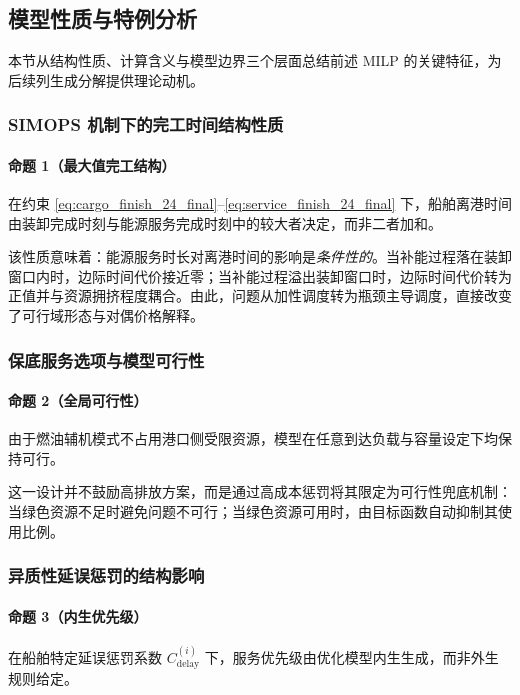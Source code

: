 \documentclass[UTF8, a4paper, 12pt]{ctexart}
\theoremstyle{plain}
\theoremstyle{definition}
\theoremstyle{remark}
\begin{document}
\subsection{模型性质与特例分析}
\label{sec:properties}

本节从结构性质、计算含义与模型边界三个层面总结前述 MILP 的关键特征，为后续列生成分解提供理论动机。

\subsubsection{SIMOPS 机制下的完工时间结构性质}

\paragraph{命题 1（最大值完工结构）}
在约束 \eqref{eq:cargo_finish_24_final}--\eqref{eq:service_finish_24_final} 下，船舶离港时间由装卸完成时刻与能源服务完成时刻中的较大者决定，而非二者加和。

该性质意味着：能源服务时长对离港时间的影响是\emph{条件性的}。当补能过程落在装卸窗口内时，边际时间代价接近零；当补能过程溢出装卸窗口时，边际时间代价转为正值并与资源拥挤程度耦合。由此，问题从加性调度转为瓶颈主导调度，直接改变了可行域形态与对偶价格解释。

\subsubsection{保底服务选项与模型可行性}

\paragraph{命题 2（全局可行性）}
由于燃油辅机模式不占用港口侧受限资源，模型在任意到达负载与容量设定下均保持可行。

这一设计并不鼓励高排放方案，而是通过高成本惩罚将其限定为可行性兜底机制：当绿色资源不足时避免问题不可行；当绿色资源可用时，由目标函数自动抑制其使用比例。

\subsubsection{异质性延误惩罚的结构影响}

\paragraph{命题 3（内生优先级）}
在船舶特定延误惩罚系数 $C^{(i)}_{\text{delay}}$ 下，服务优先级由优化模型内生生成，而非外生规则给定。
\end{document}

